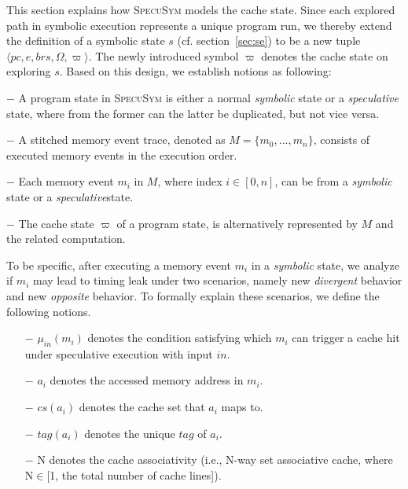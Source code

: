 \documentclass[sigconf]{acmart}
\newcommand\ignore[1]{}
\newcommand{\pcon}{\mathit{pc}}
\newcommand{\SpecuSym}{\textsc{SpecuSym} }
\begin{document}
This section explains how \SpecuSym models the cache state. Since each explored 
path in symbolic execution represents a unique program run, we thereby extend 
the definition of a symbolic state $s$ (cf. section~\ref{sec:se}) to be a new 
tuple $\langle \pcon, \mathit{e}, \mathit{brs}, \Omega, \varpi \rangle$. The 
newly introduced symbol $\varpi$ denotes the cache state on exploring $s$.
Based on this design, we establish notions as following:
%
%
\begin{itemize*}
  \item [$-$]A program state in \SpecuSym is either a normal \textit{symbolic} 
    state or a \textit{speculative} state, where from the former can the latter 
    be duplicated, but not vice versa. 
  \item [$-$]A stitched memory event trace, denoted as $\mathit{M}=\mathit{\{m_0,...,m_n\}}$, 
    consists of executed memory events in the execution order.
  \item [$-$]Each memory event $\mathit{m_i}$ in $\mathit{M}$, where index 
    $i\in [0,n]$, can be from a \textit{symbolic} state or a \textit{speculative}state.
  \item [$-$]The cache state $\varpi$ of a program state, is alternatively
    represented by $\mathit{M}$ and the related computation.
\end{itemize*}
%
%
\ignore{
On modeling the cache state, exsiting tools such as CaSym~\cite{BrotzmanLZTK2018} 
maintains and updates cache mappings during symbolic execution; others like 
Chalice~\cite{ChattopadhyayBRZ17} and \textsc{SymSC}~\cite{GuoWW18} uses 
offline constraint solving to to reason about the cache behaviors of memory 
accesses upon concrete cache models. To better coordinate the speculative 
modeling component, \SpecuSym adopts an on-the-fly analysis.
}

To be specific, after executing a memory event $m_i$ in a \textit{symbolic} state, 
we analyze if $\mathit{m_i}$ may lead to timing leak under two scenarios, namely 
new \textit{divergent} behavior and new \textit{opposite} behavior. To formally 
explain these scenarios, we define the following notions.

%
\begin{itemize}
  \item [$-$]$\mathit{\mu_{in}(m_i)}$ denotes the condition satisfying which 
    $\mathit{m_i}$ can trigger a cache hit under speculative execution with 
    input $\mathit{in}$. 
  \item [$-$]$\mathit{a_i}$ denotes the accessed memory address in $\mathit{m_i}$.
  \item [$-$]$\mathit{cs(a_i)}$ denotes the cache set that $\mathit{a_i}$ 
    maps to.
  \item [$-$]$\mathit{tag(a_i)}$ denotes the unique $\mathit{tag}$ of $\mathit{a_i}$.
  \item [$-$]{N} denotes the cache associativity (i.e., N-way set associative 
    cache, where N$\in$[1, the total number of cache lines]). 
\end{itemize}
%
\end{document}
